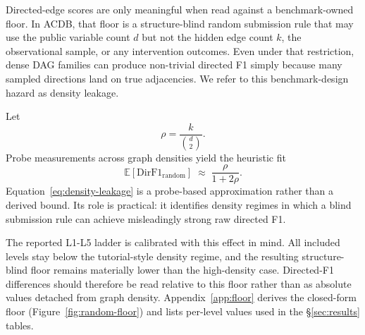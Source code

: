 Directed-edge scores are only meaningful when read against a benchmark-owned floor. In ACDB, that floor is a structure-blind random submission rule that may use the public variable count $d$ but not the hidden edge count $k$, the observational sample, or any intervention outcomes. Even under that restriction, dense DAG families can produce non-trivial directed F1 simply because many sampled directions land on true adjacencies. We refer to this benchmark-design hazard as density leakage.

Let
\begin{equation}
\rho = \frac{k}{\binom{d}{2}}.
\label{eq:density}
\end{equation}
Probe measurements across graph densities yield the heuristic fit
\begin{equation}
\mathbb{E}[\mathrm{DirF1}_{\mathrm{random}}] \;\approx\; \frac{\rho}{1 + 2\rho}.
\label{eq:density-leakage}
\end{equation}
Equation~\eqref{eq:density-leakage} is a probe-based approximation rather than a derived bound. Its role is practical: it identifies density regimes in which a blind submission rule can achieve misleadingly strong raw directed F1.

The reported L1-L5 ladder is calibrated with this effect in mind. All included levels stay below the tutorial-style density regime, and the resulting structure-blind floor remains materially lower than the high-density case. Directed-F1 differences should therefore be read relative to this floor rather than as absolute values detached from graph density. Appendix~\ref{app:floor} derives the closed-form floor (Figure~\ref{fig:random-floor}) and lists per-level values used in the §\ref{sec:results} tables.
